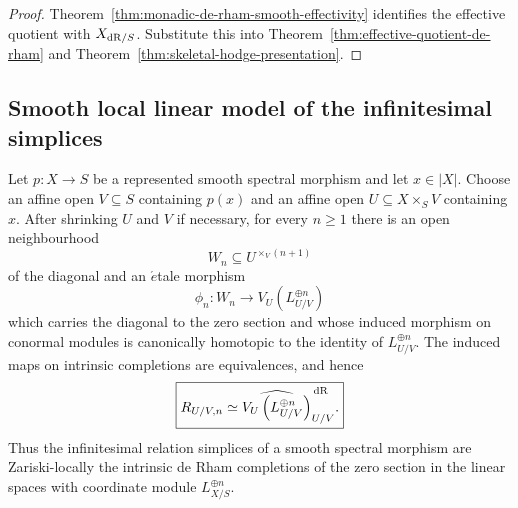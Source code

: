 \begin{proof}
Theorem~\ref{thm:monadic-de-rham-smooth-effectivity} identifies the effective quotient with
\(X_{\mathrm{dR}/S}\).  Substitute this into Theorem~\ref{thm:effective-quotient-de-rham} and
Theorem~\ref{thm:skeletal-hodge-presentation}.
\end{proof}

\subsection{Smooth local linear model of the infinitesimal simplices}

\begin{theorem}
\label{thm:monadic-de-rham-local-linear-completion}
Let \(p:X\to S\) be a represented smooth spectral morphism and let \(x\in|X|\).  Choose an affine
open \(V\subseteq S\) containing \(p(x)\) and an affine open
\(U\subseteq X\times_SV\) containing \(x\).  After shrinking \(U\) and \(V\) if necessary, for every
\(n\geq1\) there is an open neighbourhood
\[
    W_n\subseteq U^{\times_V(n+1)}
\]
of the diagonal and an \(\acute{e}\)tale morphism
\[
    \phi_n:
    W_n
    \longrightarrow
    V_U\left(L_{U/V}^{\oplus n}\right)
\]
which carries the diagonal to the zero section and whose induced morphism on
conormal modules is canonically homotopic to the identity of
\(L_{U/V}^{\oplus n}\).  The induced maps on intrinsic completions are
equivalences, and hence
\[
\boxed{
    R_{U/V,n}
    \simeq
    \widehat{
        V_U\left(L_{U/V}^{\oplus n}\right)
    }^{\,\mathrm{dR}}_{U/V}.
}
\]
Thus the infinitesimal relation simplices of a smooth spectral morphism are Zariski-locally the
intrinsic de Rham completions of the zero section in the linear spaces with coordinate module
\(L_{X/S}^{\oplus n}\).
\end{theorem}

